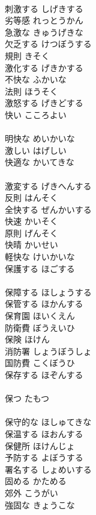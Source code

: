 \documentclass[8pt]{extreport}
\begin{document}
\begin{CJK}{UTF8}{min}
\\	刺激する	しげきする	
\\	劣等感	れっとうかん	
\\	急激な	きゅうげきな	
\\	欠乏する	けつぼうする	
\\	規則	きそく	
\\	激化する	げきかする	
\\	不快な	ふかいな	
\\	法則	ほうそく	
\\	激怒する	げきどする	
\\	快い	こころよい	
\\	[和語]
\\	明快な	めいかいな	
\\	激しい	はげしい	
\\	快適な	かいてきな	
\\	[漢語]
\\	激変する	げきへんする	
\\	反則	はんそく	
\\	全快する	ぜんかいする	
\\	快速	かいそく	
\\	原則	げんそく	
\\	快晴	かいせい	
\\	軽快な	けいかいな	
\\	保護する	ほごする	
\\	[漢語]
\\	保障する	ほしょうする	
\\	保管する	ほかんする	
\\	保育園	ほいくえん	
\\	防衛費	ぼうえいひ	
\\	保険	ほけん	
\\	消防署	しょうぼうしょ	
\\	国防費	こくぼうひ	
\\	保存する	ほぞんする	
\\	[漢語]
\\	保つ	たもつ	
\\	[和語]
\\	保守的な	ほしゅてきな	
\\	保温する	ほおんする	
\\	保健所	ほけんじょ	
\\	予防する	よぼうする	
\\	署名する	しょめいする	
\\	固める	かためる	
\\	郊外	こうがい	
\\	強固な	きょうこな	

\end{CJK}
\end{document}
